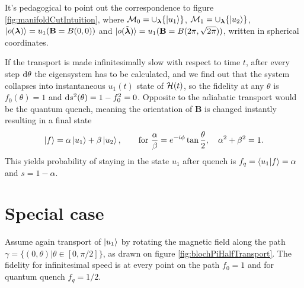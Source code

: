 It's pedagogical to point out the correspondence to figure \ref{fig:manifoldCutIntuition}, where $\mathcal{M}_0=\cup_{\bm\lambda} \{\ket{u_1}\}$,  $\mathcal{M}_1=\cup_{\bm\lambda} \{\ket{u_2}\}$, $\ket{o({\bm\lambda})}=u_1(\mathbf B=B(0,0))$ and $\ket{o(\tilde{{\bm\lambda}})}=u_1(\mathbf B=B(2\pi,\sqrt{2\pi}))$, written in spherical coordinates.


If the transport is made infinitesimally slow with respect to time $t$, after every step $\mathrm{d} \theta$ the eigensystem has to be calculated, and we find out that the system collapses into instantaneous $u_1(t)$ state of $\mathcal{H}(t)$, so the fidelity at any $\theta$ is $f_0(\theta)=1$ and $\mathrm{d} s^2(\theta)=1-f_0^2=0$. Opposite to the adiabatic transport would be the quantum quench, meaning the orientation of $\mathbf B$ is changed instantly resulting in a final state 
\begin{equation}
   \ket{f} = \alpha \ket{u_1} + \beta \ket{u_2}, \qquad\text{for } \frac{\alpha}{\beta}=e^{-i\phi}\tan\frac{\theta}{2},\quad \alpha^2+\beta^2=1.
\end{equation}
This yields probability of staying in the state $u_1$ after quench is $f_q=\braket{u_1|f}=\alpha$ and $s=1-\alpha$.

\section{Special case}
Assume again transport of $\ket{u_1}$ by rotating the magnetic field along the path $\gamma=\{(0,\theta)|\theta\in[0,\pi/2]\}$, as drawn on figure \ref{fig:blochPiHalfTransport}. The fidelity for infinitesimal speed is at every point on the path $f_0=1$ and for quantum quench $f_q=1/2$.

